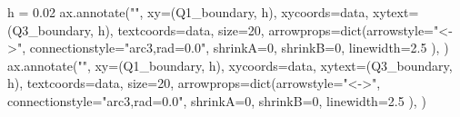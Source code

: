 \documentclass[
  letterpaper,
  DIV=11,
  numbers=noendperiod,
  oneside]{scrreprt}
\newenvironment{Shaded}{\begin{snugshade}}{\end{snugshade}}
\newcommand{\BuiltInTok}[1]{\textcolor[rgb]{0.00,0.23,0.31}{#1}}
\newcommand{\DecValTok}[1]{\textcolor[rgb]{0.68,0.00,0.00}{#1}}
\newcommand{\FloatTok}[1]{\textcolor[rgb]{0.68,0.00,0.00}{#1}}
\newcommand{\NormalTok}[1]{\textcolor[rgb]{0.00,0.23,0.31}{#1}}
\newcommand{\OperatorTok}[1]{\textcolor[rgb]{0.37,0.37,0.37}{#1}}
\newcommand{\StringTok}[1]{\textcolor[rgb]{0.13,0.47,0.30}{#1}}
\begin{document}
\begin{Shaded}
\begin{Highlighting}[]
\NormalTok{h }\OperatorTok{=} \FloatTok{0.02}
\NormalTok{ax.annotate(}\StringTok{""}\NormalTok{,}
\NormalTok{            xy}\OperatorTok{=}\NormalTok{(Q1\_boundary, h), xycoords}\OperatorTok{=}\StringTok{\textquotesingle{}data\textquotesingle{}}\NormalTok{,}
\NormalTok{            xytext}\OperatorTok{=}\NormalTok{(Q3\_boundary, h), textcoords}\OperatorTok{=}\StringTok{\textquotesingle{}data\textquotesingle{}}\NormalTok{,}
\NormalTok{            size}\OperatorTok{=}\DecValTok{20}\NormalTok{,}
\NormalTok{            arrowprops}\OperatorTok{=}\BuiltInTok{dict}\NormalTok{(arrowstyle}\OperatorTok{=}\StringTok{"\textless{}{-}\textgreater{}"}\NormalTok{,}
\NormalTok{                            connectionstyle}\OperatorTok{=}\StringTok{"arc3,rad=0.0"}\NormalTok{,}
\NormalTok{                            shrinkA}\OperatorTok{=}\DecValTok{0}\NormalTok{, shrinkB}\OperatorTok{=}\DecValTok{0}\NormalTok{,}
\NormalTok{                            linewidth}\OperatorTok{=}\FloatTok{2.5}
\NormalTok{                            ),}
\NormalTok{            )}
\NormalTok{ax.annotate(}\StringTok{""}\NormalTok{,}
\NormalTok{            xy}\OperatorTok{=}\NormalTok{(Q1\_boundary, h), xycoords}\OperatorTok{=}\StringTok{\textquotesingle{}data\textquotesingle{}}\NormalTok{,}
\NormalTok{            xytext}\OperatorTok{=}\NormalTok{(Q3\_boundary, h), textcoords}\OperatorTok{=}\StringTok{\textquotesingle{}data\textquotesingle{}}\NormalTok{,}
\NormalTok{            size}\OperatorTok{=}\DecValTok{20}\NormalTok{,}
\NormalTok{            arrowprops}\OperatorTok{=}\BuiltInTok{dict}\NormalTok{(arrowstyle}\OperatorTok{=}\StringTok{"\textless{}{-}\textgreater{}"}\NormalTok{,}
\NormalTok{                            connectionstyle}\OperatorTok{=}\StringTok{"arc3,rad=0.0"}\NormalTok{,}
\NormalTok{                            shrinkA}\OperatorTok{=}\DecValTok{0}\NormalTok{, shrinkB}\OperatorTok{=}\DecValTok{0}\NormalTok{,}
\NormalTok{                            linewidth}\OperatorTok{=}\FloatTok{2.5}
\NormalTok{                            ),}
\NormalTok{            )}


\end{Highlighting}
\end{Shaded}
\end{document}
